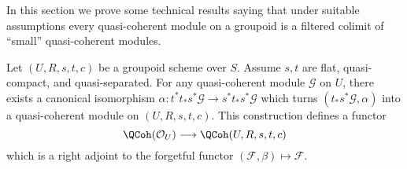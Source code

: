\noindent
In this section we prove some technical results saying that under
suitable assumptions every quasi-coherent module on a groupoid is
a filtered colimit of ``small'' quasi-coherent modules.

\begin{lemma}
\label{lemma-construct-quasi-coherent}
Let $(U, R, s, t, c)$ be a groupoid scheme over $S$.
Assume $s, t$ are flat, quasi-compact, and quasi-separated.
For any quasi-coherent module $\mathcal{G}$ on $U$, there exists
a canonical isomorphism
$\alpha : t^*t_*s^*\mathcal{G} \to s^*t_*s^*\mathcal{G}$
which turns $(t_*s^*\mathcal{G}, \alpha)$ into a quasi-coherent module
on $(U, R, s, t, c)$. This construction defines a functor
$$
\QCoh(\mathcal{O}_U) \longrightarrow \QCoh(U, R, s, t, c)
$$
which is a right adjoint to the forgetful functor
$(\mathcal{F}, \beta) \mapsto \mathcal{F}$.
\end{lemma}

